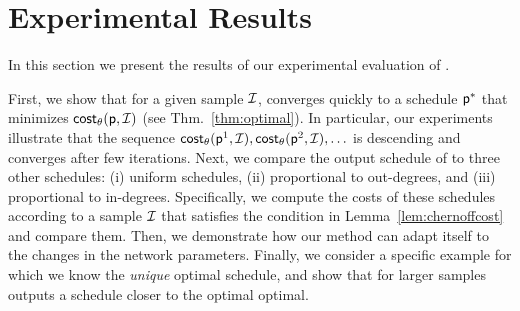 \section{Experimental Results}\label{sec:exp}
In this section we present the results of our experimental evaluation of
\algonameapx. 

 First, we show that for a given sample $\mathcal{I}$, \algonameapx
converges quickly to a schedule $\mathsf{p}^*$ that minimizes $\mathsf{cost}_\theta(\mathsf{p},
\mathcal{I})$ (see Thm.~\ref{thm:optimal}). In particular, our experiments
illustrate that the sequence $\mathsf{cost}_\theta(\mathsf{p}^1,\mathcal{I}), \mathsf{cost}_\theta(\mathsf{p}^2, \mathcal{I}),
\ldots$ is descending and converges after few iterations. Next, we compare the
output schedule of \algonameapx to three other schedules: (i) uniform schedules,
(ii) proportional to out-degrees, and (iii) proportional to in-degrees.
Specifically, we compute the costs of these schedules according to a sample
$\mathcal{I}$ that satisfies the condition in Lemma~\ref{lem:chernoffcost} and
compare them.
Then, we demonstrate how our method can adapt itself to the changes in the
network parameters. Finally, we consider a specific example for which we know
the \emph{unique} optimal schedule, and show that for larger samples
\algonameapx outputs a schedule closer to the optimal optimal.




